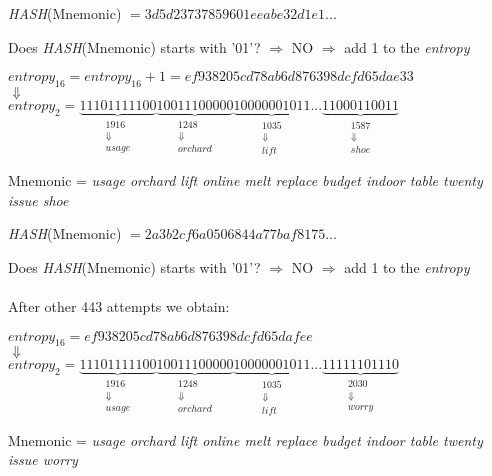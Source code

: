 \begin{center}
	\textit{HASH}(Mnemonic) $= 3d5d23737859601eeabe32d1e1...$
\end{center}
Does \textit{HASH}(Mnemonic) starts with '01'? $\Rightarrow$ NO $\Rightarrow$ add 1 to the \textit{entropy}
\begin{center}
	$entropy_{16} = entropy_{16} + 1  = ef938205cd78ab6d876398dcfd65dae33$
	\\
	$\Downarrow $
	\\
	$entropy_{2}= \underbrace{11101111100}_{\substack{1916 \\ \Downarrow\\ usage} }
	\underbrace{10011100000}_{\substack{1248 \\ \Downarrow\\ orchard}}
	\underbrace{10000001011}_{\substack{1035 \\ \Downarrow\\ lift}}
	...
	\underbrace{11000110011}_{\substack{1587 \\ \Downarrow\\ shoe}}  $
\end{center}
Mnemonic = \textit{usage orchard lift online melt replace budget indoor table twenty issue shoe}

\begin{center}
	\textit{HASH}(Mnemonic) $= 2a3b2cf6a0506844a77baf8175...$
\end{center}
Does \textit{HASH}(Mnemonic) starts with '01'? $\Rightarrow$ NO $\Rightarrow$ add 1 to the \textit{entropy}
\\ \\
After other 443 attempts we obtain:
\begin{center}
	$entropy_{16} =ef938205cd78ab6d876398dcfd65dafee$
	\\
	$\Downarrow $
	\\
	$entropy_{2}= \underbrace{11101111100}_{\substack{1916 \\ \Downarrow\\ usage} }
	\underbrace{10011100000}_{\substack{1248 \\ \Downarrow\\ orchard}}
	\underbrace{10000001011}_{\substack{1035 \\ \Downarrow\\ lift}}
	...
	\underbrace{11111101110}_{\substack{2030 \\ \Downarrow\\ worry}}  $
\end{center}
Mnemonic = \textit{usage orchard lift online melt replace budget indoor table twenty issue worry}

